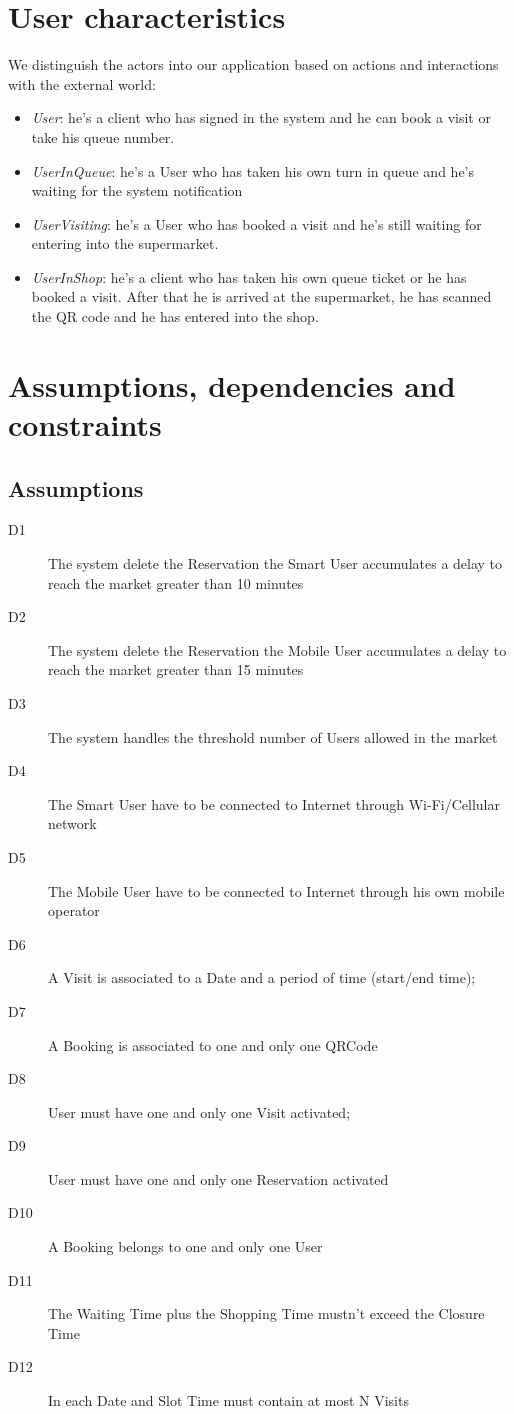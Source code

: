 \section{User characteristics}
We distinguish the actors into our application based on actions and interactions with the external world:

\begin{itemize}
\item \textit{User}: he’s a client who has signed in the system and he can book a visit or take his queue number.
\item \textit{UserInQueue}: he’s a User who has taken his own turn in queue and he’s waiting for the system notification
\item \textit{UserVisiting}: he’s a User who has booked a visit and he’s still waiting for entering into the supermarket.
\item \textit{UserInShop}: he’s a client who has taken his own queue ticket or he has booked a visit. After that he is arrived at the supermarket, he has scanned the QR code and he has entered into the shop.
\end{itemize}


\section{Assumptions, dependencies and constraints}
\subsection{Assumptions}
\begin{description}
    \item[D1] The system delete the Reservation the Smart User accumulates a delay to reach the market greater than 10 minutes
    \item[D2] The system delete the Reservation the Mobile User accumulates a delay to reach the market greater than 15 minutes
    \item[D3] The system handles the threshold number of Users allowed in the market
    \item[D4] The Smart User have to be connected to Internet through Wi-Fi/Cellular network
    \item[D5] The Mobile User have to be connected to Internet through his own mobile operator
    \item[D6] A Visit is associated to a Date and a period of time (start/end time);
    \item[D7] A Booking is associated to one and only one QRCode
    \item[D8] User must have one and only one Visit activated;
    \item[D9] User must have one and only one Reservation activated
    \item[D10] A Booking belongs to one and only one User
    \item[D11] The Waiting Time plus the Shopping Time mustn’t exceed the Closure Time
    \item[D12] In each Date and Slot Time must contain at most N Visits
\end{description}